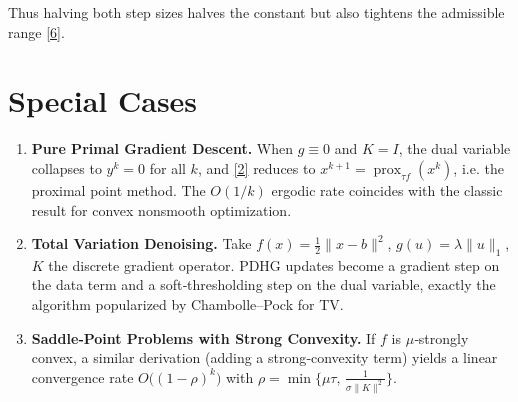 \documentclass{article}
\newcommand{\prox}{\operatorname{prox}}
\begin{document}
Thus halving both step sizes halves the constant but also tightens the admissible range \eqref{6}.

\section*{Special Cases}
\begin{enumerate}[noitemsep]
\item \textbf{Pure Primal Gradient Descent.} When $g\equiv0$ and $K=I$, the dual variable collapses to $y^{k}=0$ for all $k$, and \eqref{2} reduces to $x^{k+1}= \prox_{\tau f}(x^{k})$, i.e. the proximal point method. The $O(1/k)$ ergodic rate coincides with the classic result for convex nonsmooth optimization.
\item \textbf{Total Variation Denoising.} Take $f(x)=\frac12\|x-b\|^{2}$, $g(u)=\lambda\|u\|_{1}$, $K$ the discrete gradient operator. PDHG updates become a gradient step on the data term and a soft‑thresholding step on the dual variable, exactly the algorithm popularized by Chambolle–Pock for TV.
\item \textbf{Saddle‑Point Problems with Strong Convexity.} If $f$ is $\mu$‑strongly convex, a similar derivation (adding a strong‑convexity term) yields a linear convergence rate $O\bigl((1-\rho)^{k}\bigr)$ with $\rho=\min\{\mu\tau,\,\frac{1}{\sigma\|K\|^{2}}\}$.
\end{enumerate}
\end{document}
